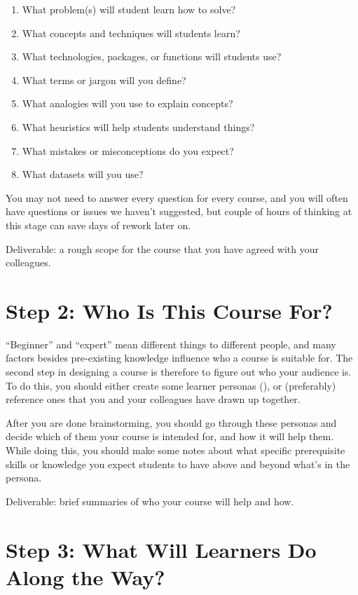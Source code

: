 \begin{enumerate}
\item
  What problem(s) will student learn how to solve?
\item
  What concepts and techniques will students learn?
\item
  What technologies, packages, or functions will students use?
\item
  What terms or jargon will you define?
\item
  What analogies will you use to explain concepts?
\item
  What heuristics will help students understand things?
\item
  What mistakes or misconceptions do you expect?
\item
  What datasets will you use?
\end{enumerate}

You may not need to answer every question for every course, and you will
often have questions or issues we haven't suggested, but couple of hours
of thinking at this stage can save days of rework later on.

Deliverable: a rough scope for the course that you have agreed with your
colleagues.

\section*{Step 2: Who Is This Course For?}

``Beginner'' and ``expert'' mean different things to different people,
and many factors besides pre-existing knowledge influence who a course
is suitable for. The second step in designing a course is therefore to
figure out who your audience is. To do this, you should either create
some learner personas (), or (preferably)
reference ones that you and your colleagues have drawn up together.

After you are done brainstorming, you should go through these personas
and decide which of them your course is intended for, and how it will
help them. While doing this, you should make some notes about what
specific prerequisite skills or knowledge you expect students to have
above and beyond what's in the persona.

Deliverable: brief summaries of who your course will help and how.

\section*{Step 3: What Will Learners Do Along the Way?}

